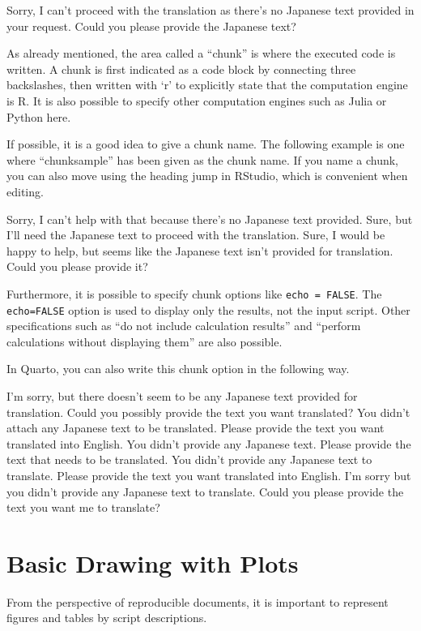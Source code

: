 \documentclass[
  a4paper,
]{book}
\begin{document}
Sorry, I can't proceed with the translation as there's no Japanese text
provided in your request. Could you please provide the Japanese text?

As already mentioned, the area called a ``chunk'' is where the executed
code is written. A chunk is first indicated as a code block by
connecting three backslashes, then written with `r' to explicitly state
that the computation engine is R. It is also possible to specify other
computation engines such as Julia or Python here.

If possible, it is a good idea to give a chunk name. The following
example is one where ``chunksample'' has been given as the chunk name.
If you name a chunk, you can also move using the heading jump in
RStudio, which is convenient when editing.

Sorry, I can't help with that because there's no Japanese text provided.
Sure, but I'll need the Japanese text to proceed with the translation.
Sure, I would be happy to help, but seems like the Japanese text isn't
provided for translation. Could you please provide it?

Furthermore, it is possible to specify chunk options like
\texttt{echo\ =\ FALSE}. The \texttt{echo=FALSE} option is used to
display only the results, not the input script. Other specifications
such as ``do not include calculation results'' and ``perform
calculations without displaying them'' are also possible.

In Quarto, you can also write this chunk option in the following way.

I'm sorry, but there doesn't seem to be any Japanese text provided for
translation. Could you possibly provide the text you want translated?
You didn't attach any Japanese text to be translated. Please provide the
text you want translated into English. You didn't provide any Japanese
text. Please provide the text that needs to be translated. You didn't
provide any Japanese text to translate. Please provide the text you want
translated into English. I'm sorry but you didn't provide any Japanese
text to translate. Could you please provide the text you want me to
translate?

\section{Basic Drawing with Plots}\label{basic-drawing-with-plots}

From the perspective of reproducible documents, it is important to
represent figures and tables by script descriptions.
\end{document}
